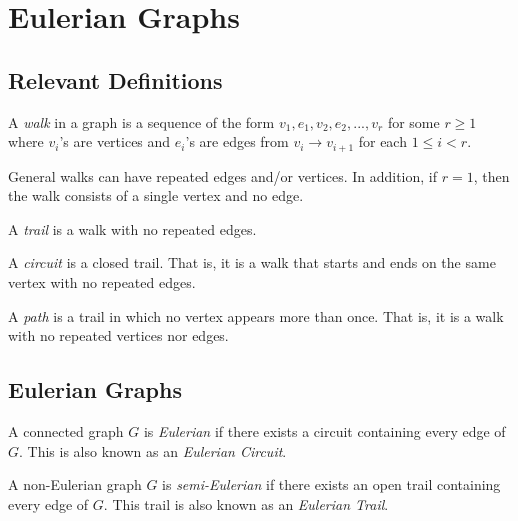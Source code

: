 \chapter{Eulerian Graphs}

\section{Relevant Definitions}

\begin{definition}[Walks]
  A \textit{walk} in a graph is a sequence of the form \(v_1, e_1, v_2, e_2,
  ..., v_r\) for some \(r \geq 1\) where \(v_i\)'s are vertices and
  \(e_i\)'s are edges from \(v_i \to v_{i+1}\) for each \(1 \leq i < r\).
\end{definition}

\begin{remark}
  General walks can have repeated edges and/or vertices. In addition, if 
  \(r = 1\), then the walk consists of a single vertex and no edge.
\end{remark}

\begin{definition}[Trails]
  A \textit{trail} is a walk with no repeated edges.
\end{definition}

\begin{definition}[Circuits]
  A \textit{circuit} is a closed trail. That is, it is a walk that starts and
  ends on the same vertex with no repeated edges.
\end{definition}

\begin{definition}
  A \textit{path} is a trail in which no vertex appears more than once. That is,
  it is a walk with no repeated vertices nor edges.
\end{definition}

\section{Eulerian Graphs}

\begin{definition}
  A connected graph \(G\) is \textit{Eulerian} if there exists a circuit containing
  every edge of \(G\). This is also known as an \textit{Eulerian Circuit}.
\end{definition}

\begin{definition}
  A non-Eulerian graph \(G\) is \textit{semi-Eulerian} if there exists an open trail
  containing every edge of \(G\). This trail is also known as an 
  \textit{Eulerian Trail}.
\end{definition}

